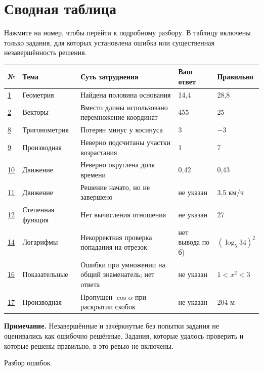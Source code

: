 \documentclass[a4paper,11pt]{article}
\begin{document}
\section*{Сводная таблица}
\noindent\small Нажмите на номер, чтобы перейти к подробному разбору. В таблицу включены только задания, для которых установлена ошибка или существенная незавершённость решения.\normalsize
\par\vspace{6pt}
\noindent\small
\begin{tabularx}{\linewidth}{@{}>{\centering\arraybackslash}p{10mm}p{26mm}X p{25mm} p{29mm}@{}}
\toprule
\textbf{№}&\textbf{Тема}&\textbf{Суть затруднения}&\textbf{Ваш ответ}&\textbf{Правильно}\\
\midrule
\hyperref[task:1]{1}&Геометрия&Найдена половина основания&14,4&28,8\\
\hyperref[task:2]{2}&Векторы&Вместо длины использовано перемножение координат&455&25\\
\hyperref[task:8]{8}&Тригонометрия&Потерян минус у косинуса&3&$-3$\\
\hyperref[task:9]{9}&Производная&Неверно подсчитаны участки возрастания&1&7\\
\hyperref[task:10]{10}&Движение&Неверно округлена доля времени&0,42&0,43\\
\hyperref[task:11]{11}&Движение&Решение начато, но не завершено&не указан&3,5 км/ч\\
\hyperref[task:12]{12}&Степенная функция&Нет вычисления отношения&не указан&27\\
\hyperref[task:14]{14}&Логарифмы&Некорректная проверка попадания на отрезок&нет вывода по б)&$(\log_5 34)^2$\\
\hyperref[task:16]{16}&Показательные&Ошибки при умножении на общий знаменатель; нет ответа&не указан&$1<x^2<3$\\
\hyperref[task:17]{17}&Производная&Пропущен $\cos\alpha$ при раскрытии скобок&не указан&204 м\\
\bottomrule
\end{tabularx}
\normalsize
\vspace{15pt}
\textcolor{ink}{\textbf{Примечание.}} Незавершённые и зачёркнутые без попытки задания не оценивались как ошибочно решённые. Задания, которые удалось проверить и которые решены правильно, в это ревью не включены.
\clearpage
\thispagestyle{empty}
\vspace*{.30\textheight}
\begin{center}{\Huge\color{accent} Разбор ошибок}\end{center}
\end{document}
